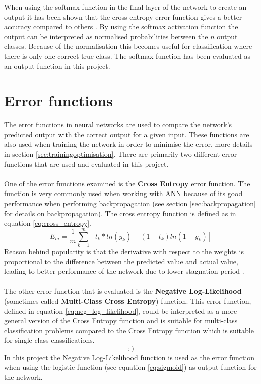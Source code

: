 When using the softmax function in the final layer of the network to create an output it has been shown that the cross entropy error function gives a better accuracy compared to others \parencite{dunne1997pairing,golik2013cross}. By using the softmax activation function the output can be interpreted as normalised probabilities between the $n$ output classes. Because of the normalisation this becomes useful for classification where there is only one correct true class. The softmax function has been evaluated as an output function in this project.

\section{Error functions} \label{errorfunction}
The error functions in neural networks are used to compare the network's predicted output with the correct output for a given input. These functions are also used when training the network in order to minimise the error, more details in section \ref{sec:trainingoptimisation}. There are primarily two different error functions that are used and evaluated in this project.
\\\\
One of the error functions examined is the \textbf{Cross Entropy} error function. The function is very commonly used when working with ANN because of its good performance when performing backpropagation (see section \ref{sec:backpropagation} for details on backpropagation). The cross entropy function is defined as in equation \ref{eq:cross_entropy}.
\begin{equation} \label{eq:cross_entropy}
    E_m = \frac{1}{m}\sum_{k=1}^{m} [t_k * ln(y_k) +(1-t_k)ln(1-y_k) ]
\end{equation}
Reason behind popularity is that the derivative with respect to the weights is proportional to the difference between the predicted value and actual value, leading to better performance of the network due to lower stagnation period \parencite{nasr2002cross}.
\\\\
The other error function that is evaluated is the \textbf{Negative Log-Likelihood} (sometimes called \textbf{Multi-Class Cross Entropy}) function. This error function, defined in equation \ref{eq:neg_log_likelihood}, could be interpreted as a more general version of the Cross Entropy function and is suitable for multi-class classification problems compared to the Cross Entropy function which is suitable for single-class classifications.
\begin{equation} \label{eq:neg_log_likelihood}
    :)
\end{equation}
In this project the Negative Log-Likelihood function is used as the error function when using the logistic function (see equation \ref{eq:sigmoid}) as output function for the network.

